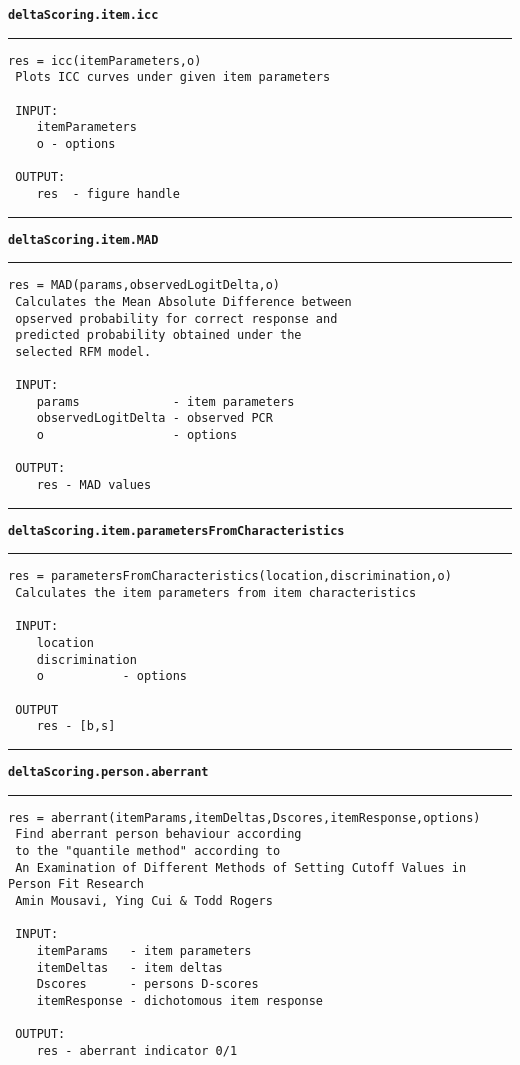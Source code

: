 {\bf\tt deltaScoring.item.icc}
\par\noindent\rule{\textwidth}{0.4pt}
\begin{lstlisting}[style=Matlab-bw]
 res = icc(itemParameters,o)
 Plots ICC curves under given item parameters

 INPUT: 
	itemParameters
	o - options

 OUTPUT: 
	res  - figure handle
\end{lstlisting}
\par\noindent\rule{\textwidth}{0.4pt}
{\bf\tt deltaScoring.item.MAD}
\par\noindent\rule{\textwidth}{0.4pt}
\begin{lstlisting}[style=Matlab-bw]
 res = MAD(params,observedLogitDelta,o)
 Calculates the Mean Absolute Difference between
 opserved probability for correct response and
 predicted probability obtained under the
 selected RFM model.

 INPUT:
	params             - item parameters
	observedLogitDelta - observed PCR
	o                  - options

 OUTPUT:
 	res - MAD values
\end{lstlisting}
\par\noindent\rule{\textwidth}{0.4pt}
{\bf\tt deltaScoring.item.parametersFromCharacteristics}
\par\noindent\rule{\textwidth}{0.4pt}
\begin{lstlisting}[style=Matlab-bw]
 res = parametersFromCharacteristics(location,discrimination,o)
 Calculates the item parameters from item characteristics

 INPUT:
	location
	discrimination
	o           - options

 OUTPUT
	res - [b,s]
\end{lstlisting}
\par\noindent\rule{\textwidth}{0.4pt}
{\bf\tt deltaScoring.person.aberrant}
\par\noindent\rule{\textwidth}{0.4pt}
\begin{lstlisting}[style=Matlab-bw]
 res = aberrant(itemParams,itemDeltas,Dscores,itemResponse,options)
 Find aberrant person behaviour according
 to the "quantile method" according to
 An Examination of Different Methods of Setting Cutoff Values in Person Fit Research
 Amin Mousavi, Ying Cui & Todd Rogers

 INPUT:
	itemParams   - item parameters
	itemDeltas   - item deltas
	Dscores      - persons D-scores
	itemResponse - dichotomous item response

 OUTPUT:
	res - aberrant indicator 0/1
\end{lstlisting}

